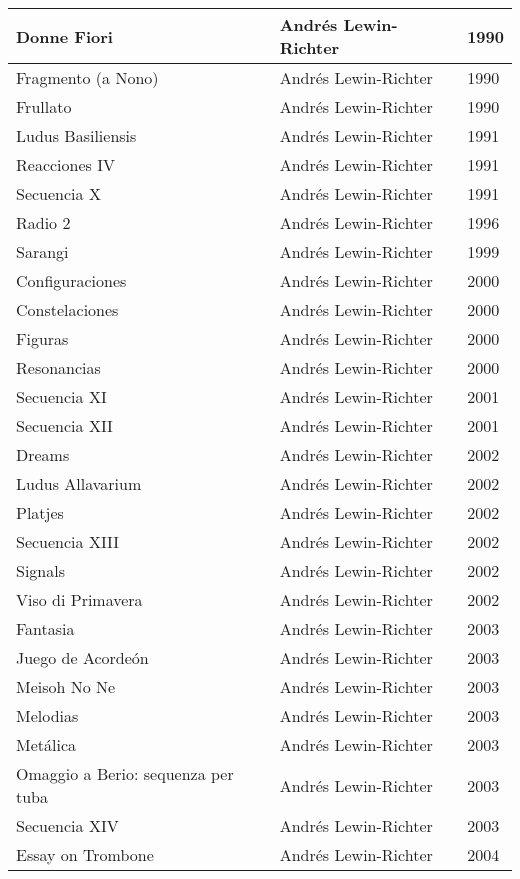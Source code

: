 \begin{center}
\begin{longtable}{| p{} | p{} | p{} |}
Donne Fiori & Andrés Lewin-Richter & 1990 \\ \hline 
Fragmento (a Nono) & Andrés Lewin-Richter & 1990 \\ \hline 
Frullato & Andrés Lewin-Richter & 1990 \\ \hline 
Ludus Basiliensis & Andrés Lewin-Richter & 1991 \\ \hline 
Reacciones IV & Andrés Lewin-Richter & 1991 \\ \hline 
Secuencia X & Andrés Lewin-Richter & 1991 \\ \hline 
Radio 2 & Andrés Lewin-Richter & 1996 \\ \hline 
Sarangi & Andrés Lewin-Richter & 1999 \\ \hline 
Configuraciones & Andrés Lewin-Richter & 2000 \\ \hline 
Constelaciones & Andrés Lewin-Richter & 2000 \\ \hline 
Figuras & Andrés Lewin-Richter & 2000 \\ \hline 
Resonancias & Andrés Lewin-Richter & 2000 \\ \hline 
Secuencia XI & Andrés Lewin-Richter & 2001 \\ \hline 
Secuencia XII & Andrés Lewin-Richter & 2001 \\ \hline 
Dreams & Andrés Lewin-Richter & 2002 \\ \hline 
Ludus Allavarium & Andrés Lewin-Richter & 2002 \\ \hline 
Platjes & Andrés Lewin-Richter & 2002 \\ \hline 
Secuencia XIII & Andrés Lewin-Richter & 2002 \\ \hline 
Signals & Andrés Lewin-Richter & 2002 \\ \hline 
Viso di Primavera & Andrés Lewin-Richter & 2002 \\ \hline 
Fantasia & Andrés Lewin-Richter & 2003 \\ \hline 
Juego de Acordeón & Andrés Lewin-Richter & 2003 \\ \hline 
Meisoh No Ne & Andrés Lewin-Richter & 2003 \\ \hline 
Melodias & Andrés Lewin-Richter & 2003 \\ \hline 
Metálica & Andrés Lewin-Richter & 2003 \\ \hline 
Omaggio a Berio: sequenza per tuba & Andrés Lewin-Richter & 2003 \\ \hline 
Secuencia XIV & Andrés Lewin-Richter & 2003 \\ \hline 
Essay on Trombone & Andrés Lewin-Richter & 2004 \\ \hline 

\end{longtable}
\end{center}
